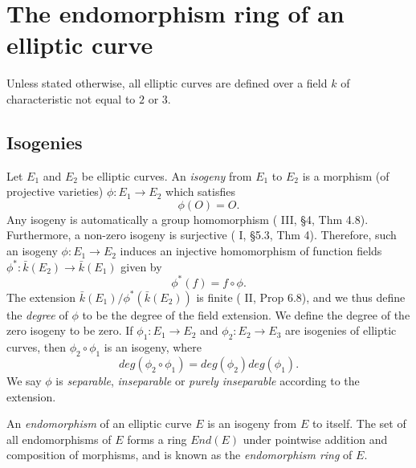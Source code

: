 \section{The endomorphism ring of an elliptic curve}
\label{sec:endomorphism-ring-of-an-elliptic-curve}

Unless stated otherwise, all elliptic curves are defined over a field $k$ of
characteristic not equal to $2$ or $3$.

\subsection{Isogenies}
\label{sec:isogenies}

Let $E_{1}$ and $E_{2}$ be elliptic curves.  An \emph{isogeny} from $E_{1}$ to
$E_{2}$ is a morphism (of projective varieties) $\phi \colon E_{1} \rightarrow E_{2}$
which satisfies
\begin{equation*}
  \phi \left( O \right) = O.
\end{equation*}
Any isogeny is automatically a group homomorphism (\cite{silverman86} III, \S 4, Thm
4.8).  Furthermore, a non-zero isogeny is surjective (\cite{shafarevich94} I, \S 5.3,
Thm 4).  Therefore, such an isogeny $\phi \colon E_{1} \rightarrow E_{2}$ induces an
injective homomorphism of function fields $\phi^{*} \colon \bar{k}\left(E_{2}\right)
\rightarrow \bar{k}\left(E_{1}\right)$ given by
\begin{equation*}
  \phi^{*}\left(f\right) = f \circ \phi.
\end{equation*}
The extension $\bar{k}\left(E_{1}\right) /
\phi^{*}\left(\bar{k}\left(E_{2}\right)\right)$ is finite (\cite{hartshorne77} II,
Prop 6.8), and we thus define the \emph{degree} of $\phi$ to be the degree of the
field extension.  We define the degree of the zero isogeny to be zero.  If $\phi_{1}
\colon E_{1} \rightarrow E_{2}$ and $\phi_{2} \colon E_{2} \rightarrow E_{3}$ are
isogenies of elliptic curves, then $\phi_{2} \circ \phi_{1}$ is an isogeny, where
\begin{equation}
  \label{eq:degree-of-composition}
  deg \left( \phi_{2} \circ \phi_{1} \right) = deg \left( \phi_{2} \right) deg \left( \phi_{1} \right).
\end{equation}
We say $\phi$ is \emph{separable}, \emph{inseparable} or \emph{purely inseparable}
according to the extension.

An \emph{endomorphism} of an elliptic curve $E$ is an isogeny from $E$ to itself.
The set of all endomorphisms of $E$ forms a ring $End(E)$ under pointwise addition
and composition of morphisms, and is known as the \emph{endomorphism ring} of $E$.

